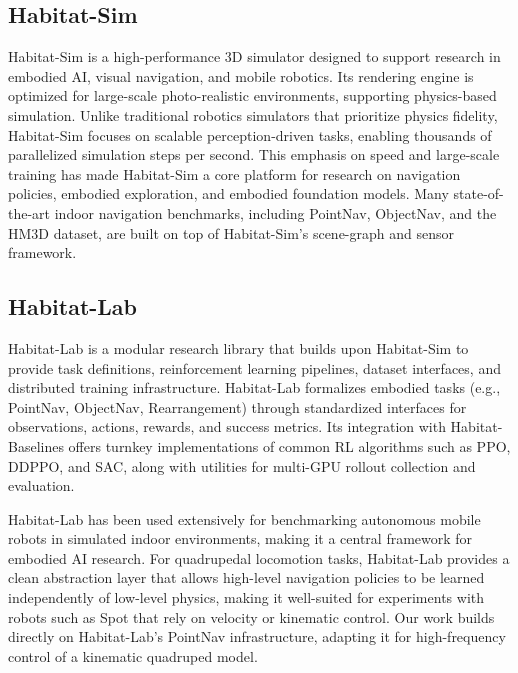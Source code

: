 \documentclass{article} %
\begin{document}
\subsection{Habitat-Sim}
Habitat-Sim \cite{habitat19iccv,szot2021habitat,puig2023habitat3} is a high-performance 3D simulator designed to support research in embodied AI, visual navigation, and mobile robotics. Its rendering engine is optimized for large-scale photo-realistic environments, supporting physics-based simulation. Unlike traditional robotics simulators that prioritize physics fidelity, Habitat-Sim focuses on scalable perception-driven tasks, enabling thousands of parallelized simulation steps per second. This emphasis on speed and large-scale training has made Habitat-Sim a core platform for research on navigation policies, embodied exploration, and embodied foundation models. Many state-of-the-art indoor navigation benchmarks, including PointNav\cite{partsey2022mapping}, ObjectNav\cite{batra2020objectnav}, and the HM3D\cite{chang2017matterport3d,ramakrishnan2021habitat} dataset, are built on top of Habitat-Sim’s scene-graph and sensor framework.

\subsection{Habitat-Lab}
Habitat-Lab \cite{habitat19iccv,szot2021habitat,puig2023habitat3} is a modular research library that builds upon Habitat-Sim to provide task definitions, reinforcement learning pipelines, dataset interfaces, and distributed training infrastructure. Habitat-Lab formalizes embodied tasks (e.g., PointNav, ObjectNav, Rearrangement) through standardized interfaces for observations, actions, rewards, and success metrics. Its integration with Habitat-Baselines offers turnkey implementations of common RL algorithms such as PPO, DDPPO, and SAC, along with utilities for multi-GPU rollout collection and evaluation. 

Habitat-Lab has been used extensively for benchmarking autonomous mobile robots in simulated indoor environments, making it a central framework for embodied AI research. For quadrupedal locomotion tasks, Habitat-Lab provides a clean abstraction layer that allows high-level navigation policies to be learned independently of low-level physics, making it well-suited for experiments with robots such as Spot that rely on velocity or kinematic control. Our work builds directly on Habitat-Lab’s PointNav infrastructure, adapting it for high-frequency control of a kinematic quadruped model.
\end{document}
